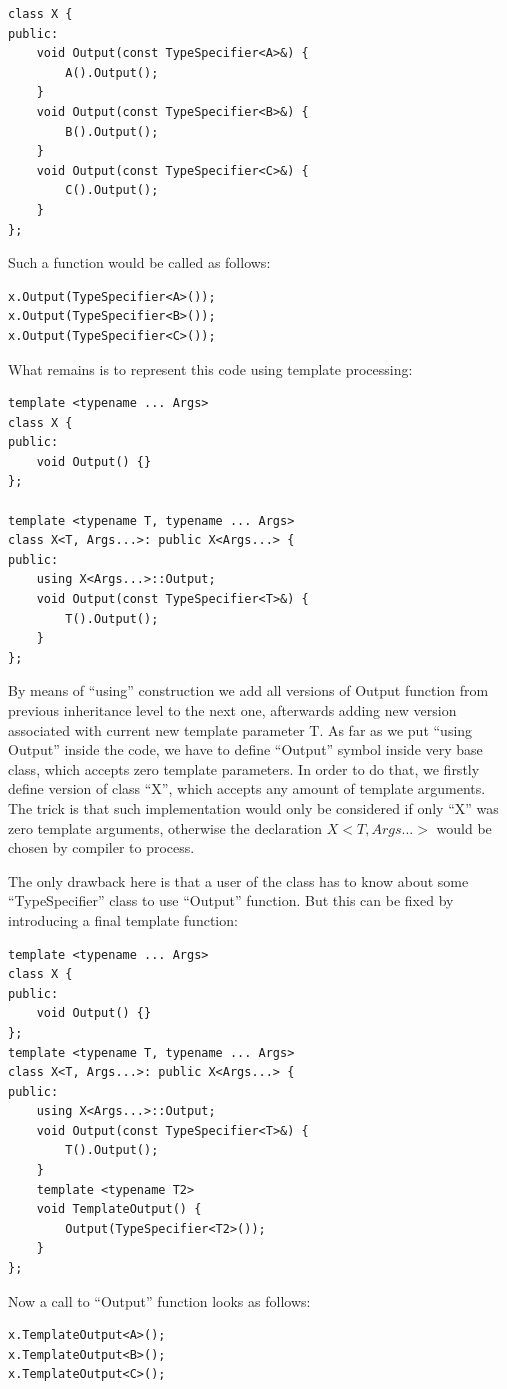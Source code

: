\documentclass{article}
\begin{document}
\begin{lstlisting}
class X {
public:
	void Output(const TypeSpecifier<A>&) {
		A().Output();
	}
	void Output(const TypeSpecifier<B>&) {
		B().Output();
	}
	void Output(const TypeSpecifier<C>&) {
		C().Output();
	}
};
\end{lstlisting}
Such a function would be called as follows:

\begin{lstlisting}
x.Output(TypeSpecifier<A>());
x.Output(TypeSpecifier<B>());
x.Output(TypeSpecifier<C>());
\end{lstlisting}
What remains is to represent this code using template processing:

\begin{lstlisting}
template <typename ... Args>
class X {
public:
	void Output() {}
};

template <typename T, typename ... Args>
class X<T, Args...>: public X<Args...> {
public:
	using X<Args...>::Output;
	void Output(const TypeSpecifier<T>&) {
		T().Output();
	}
};
\end{lstlisting}
By means of ``using'' construction we add all versions of Output function from previous inheritance level to the next one, afterwards adding new version associated with current new template parameter T. As far as we put ``using Output'' inside the code, we have to define ``Output'' symbol inside very base class, which accepts zero template parameters. In order to do that, we firstly define version of class ``X'', which accepts any amount of template arguments. The trick is that such implementation would only be considered if only ``X'' was zero template arguments, otherwise the declaration $X<T, Args...>$ would be chosen by compiler to process.

The only drawback here is that a user of the class has to know about some ``TypeSpecifier'' class to use ``Output'' function. But this can be fixed by introducing a final template function:

\begin{lstlisting}
template <typename ... Args>
class X {
public:
	void Output() {}
};
template <typename T, typename ... Args>
class X<T, Args...>: public X<Args...> {
public:
	using X<Args...>::Output;
	void Output(const TypeSpecifier<T>&) {
		T().Output();
	}
	template <typename T2>
	void TemplateOutput() {
		Output(TypeSpecifier<T2>());
	}
};
\end{lstlisting}

Now a call to ``Output'' function looks as follows:
\begin{lstlisting}
x.TemplateOutput<A>();
x.TemplateOutput<B>();
x.TemplateOutput<C>();
\end{lstlisting}
\end{document}
